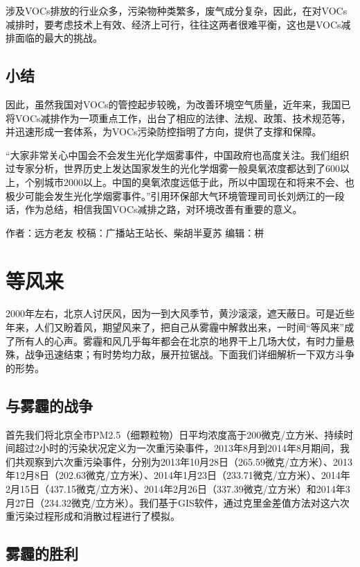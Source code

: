 \documentclass[]{book}
\begin{document}
涉及VOCs排放的行业众多，污染物种类繁多，废气成分复杂，因此，在对VOCs减排时，要考虑技术上有效、经济上可行，往往这两者很难平衡，这也是VOCs减排面临的最大的挑战。

\subsection{小结}

因此，虽然我国对VOCs的管控起步较晚，为改善环境空气质量，近年来，我国已将VOCs减排作为一项重点工作，出台了相应的法律、法规、政策、技术规范等，并迅速形成一套体系，为VOCs污染防控指明了方向，提供了支撑和保障。

``大家非常关心中国会不会发生光化学烟雾事件，中国政府也高度关注。我们组织过专家分析，世界历史上发达国家发生的光化学烟雾一般臭氧浓度都达到了600以上，个别城市2000以上。中国的臭氧浓度远低于此，所以中国现在和将来不会、也极少可能会发生光化学烟雾事件。''引用环保部大气环境管理司司长刘炳江的一段话，作为总结，相信我国VOCs减排之路，对环境改善有重要的意义。

作者：远方老友 校稿：广播站王站长、柴胡半夏苏 编辑：栟

\section{等风来}

2000年左右，北京人讨厌风，因为一到大风季节，黄沙滚滚，遮天蔽日。可是近些年来，人们又盼着风，期望风来了，把自己从雾霾中解救出来，一时间``等风来''成了所有人的心声。雾霾和风几乎每年都会在北京的地界干上几场大仗，有时力量悬殊，战争迅速结束；有时势均力敌，展开拉锯战。下面我们详细解析一下双方斗争的形势。

\subsection{与雾霾的战争}

首先我们将北京全市PM2.5（细颗粒物）日平均浓度高于200微克/立方米、持续时间超过2小时的污染状况定义为一次重污染事件，2013年8月到2014年8月期间，我们共观察到六次重污染事件，分别为2013年10月28日（265.59微克/立方米）、2013年12月8日（202.63微克/立方米）、2014年1月23日（233.71微克/立方米）、2014年2月15日（437.15微克/立方米）、2014年2月26日（337.39微克/立方米）和2014年3月27日（234.32微克/立方米）。我们基于GIS软件，通过克里金差值方法对这六次重污染过程形成和消散过程进行了模拟。

\subsection{雾霾的胜利}
\end{document}
